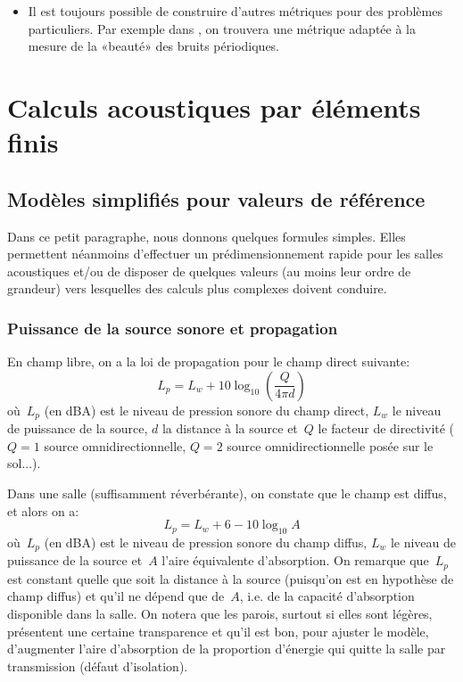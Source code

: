 {\begin{itemize}
   \item Il est toujours possible de construire d'autres métriques pour des problèmes particuliers. Par exemple dans \cite{bib-VM-suav}, on trouvera une métrique adaptée à la mesure de la «beauté» des bruits périodiques.
\end{itemize}

\medskip
\section{Calculs acoustiques par éléments finis}\label{Sec-AcouMEF}

\medskip
\subsection{Modèles simplifiés pour valeurs de référence}

Dans ce petit paragraphe, nous donnons quelques formules simples.
Elles permettent néanmoins d'effectuer un prédimensionnement rapide pour les salles acoustiques et/ou de disposer de quelques valeurs (au moins leur ordre de grandeur) vers lesquelles des calculs plus complexes doivent conduire.

\medskip
\subsubsection{Puissance de la source sonore et propagation}

En champ libre, on a la loi de propagation pour le champ direct suivante:
\begin{equation}
L_p=L_w+10\log_{10}\left(\dfrac{Q}{4\pi d}\right)
\end{equation}
où~$L_p$ (en dBA) est le niveau de pression sonore du champ direct, $L_w$ le niveau de puissance de la source, $d$ la distance à la source et~$Q$ le facteur de directivité ($Q=1$ source omnidirectionnelle, $Q=2$ source omnidirectionnelle posée sur le sol...).

\medskip
Dans une salle (suffisamment réverbérante), on constate que le champ est diffus, et alors on a:
\begin{equation}
L_p = L_w + 6 - 10\log_{10} A
\end{equation}
où~$L_p$ (en dBA) est le niveau de pression sonore du champ diffus, $L_w$ le niveau de puissance de la source et~$A$ l'aire équivalente d'absorption.
On remarque que~$L_p$ est constant quelle que soit la distance à la source (puisqu'on est en hypothèse de champ diffus) et qu'il ne dépend que de~$A$, i.e. de la capacité d'absorption disponible dans la salle.
On notera que les parois, surtout si elles sont légères, présentent une certaine transparence et qu'il est bon, pour ajuster le modèle, d'augmenter l'aire d'absorption de la proportion d'énergie qui quitte la salle par transmission (défaut d'isolation).

}
